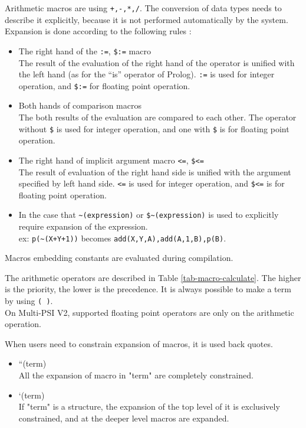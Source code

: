 Arithmetic macros are using \verb|+,-,*,/|.
The conversion of data types needs to describe it explicitly,
because it is not performed automatically by the system.
Expansion is done according to the following rules :
\begin{itemize}

\item The right hand of the \verb|:=|, \verb|$:=| macro\\
\index{\verb|:=|} \index{\verb|$:=|}
The result of the evaluation of the right hand of the operator is
unified with the left hand (as for the ``is'' operator of Prolog).
\verb|:=| is used for integer operation,
and \verb|$:=| for floating point operation.

\item Both hands of comparison macros\\
The both results of the evaluation are compared to each other.
The operator without \verb|$| is used for integer operation, and
one with \verb|$| is for floating point operation.

\item The right hand of implicit argument macro \verb|<=|, \verb|$<=|\\
\index{\verb|<=|} \index{\verb|$<=|}
The result of evaluation of the right hand side is unified
with the argument specified by left hand side.
\verb|<=| is used for integer operation, and
\verb|$<=| is for floating point operation.

\item In the case that \verb|~(expression)| or \verb|$~(expression)|
is used to explicitly require expansion of the expression.\\
\index{\verb|~|} \index{\verb|$~|}
ex: \verb|p(~(X+Y+1))| becomes \verb|add(X,Y,A),add(A,1,B),p(B)|.
\end{itemize}
Macros embedding constants are evaluated during compilation.

The arithmetic operators are described in Table \ref{tab-macro-calculate}. 
The higher is the priority, the lower is the precedence.
It is always possible to make a term by using \verb|( )|.\\
\Caution On Multi-PSI V2, supported floating point operators are only on
the arithmetic operation.

When users need to constrain expansion of macros, it is used back quotes.
\begin{itemize}
\item ``(term)\\ 
All the expansion of macro in "term" are completely constrained.
\item `(term)\\ 
If "term" is a structure, the expansion of the top level of it is exclusively
constrained, and at the deeper level macros are expanded.
\end{itemize}
\vspace{1ex}

